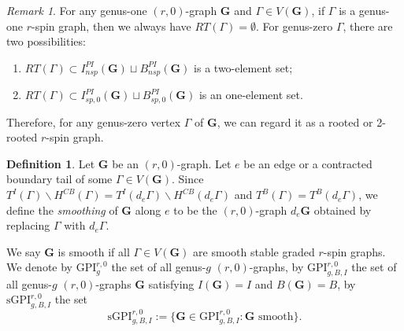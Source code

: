 \documentclass[11pt]{amsart}
\theoremstyle{definition}
\newtheorem{dfn}[dummy]{Definition}
\theoremstyle{remark}
\newtheorem{rmk}[dummy]{Remark}
\newcommand{\<}{\left<}
\renewcommand{\>}{\right>}
\numberwithin{equation}{section}
\def\GPI{{\text{GPI}}}
\def\sGPI{\text{sGPI}}
\begin{document}
\begin{rmk}\label{rmk root for vertex of PI graph}
    For any genus-one $(r,0)$-graph $\mathbf{G}$ and $\Gamma\in V(\mathbf{G})$, if $\Gamma$ is a genus-one $r$-spin graph, then we always have $RT(\Gamma)=\emptyset$. For genus-zero $\Gamma$, there are two possibilities:
    \begin{enumerate}
        \item $RT(\Gamma)\subset I^{PI}_{nsp}(\mathbf{G})\sqcup B^{PI}_{nsp}(\mathbf{G})$ is a two-element set;
        \item $RT(\Gamma)\subset I^{PI}_{sp,0}(\mathbf{G})\sqcup B^{PI}_{sp,0}(\mathbf{G})$ is an one-element set.
    \end{enumerate}
    Therefore, for any genus-zero vertex $\Gamma$ of $\mathbf{G}$, we can regard it as a rooted or 2-rooted $r$-spin graph.
\end{rmk}




\begin{dfn}
Let $\mathbf{G}$ be an $(r,0)$-graph. Let $e$ be an edge or a contracted boundary tail of %
some $\Gamma\in V(\mathbf{G})$. %
Since $T^I(\Gamma)\backslash H^{CB}(\Gamma)=T^I(d_e \Gamma)\backslash H^{CB}(d_e \Gamma)$ and %
$T^B(\Gamma)=T^B(d_e \Gamma)$, we define the \textit{smoothing} of $\mathbf{G}$ along $e$ to be the $(r,0)$-graph $d_e \mathbf{G}$ obtained by replacing $\Gamma$ with $d_e \Gamma$.


We say $\mathbf{G}$ is smooth if all $\Gamma\in V(\mathbf{G})$ are smooth stable graded $r$-spin graphs.
We denote by $\GPI^{r,0}_g$ the set of all genus-$g$ $(r,0)$-graphs, by $\GPI^{r,0}_{g,B,I}$ the set of all genus-$g$ $(r,0)$-graphs $\mathbf{G}$ satisfying $I(\mathbf{G})=I$ and %
$B(\mathbf{G})=B$, by %
$\sGPI^{r,0}_{g,B,I}$ the set 
$$ 
\sGPI^{r,0}_{g,B,I}:=\{\mathbf{G}\in \GPI^{r,0}_{g,B,I}\colon \mathbf{G}\text{ smooth}\}.
$$
\end{dfn}
\end{document}
